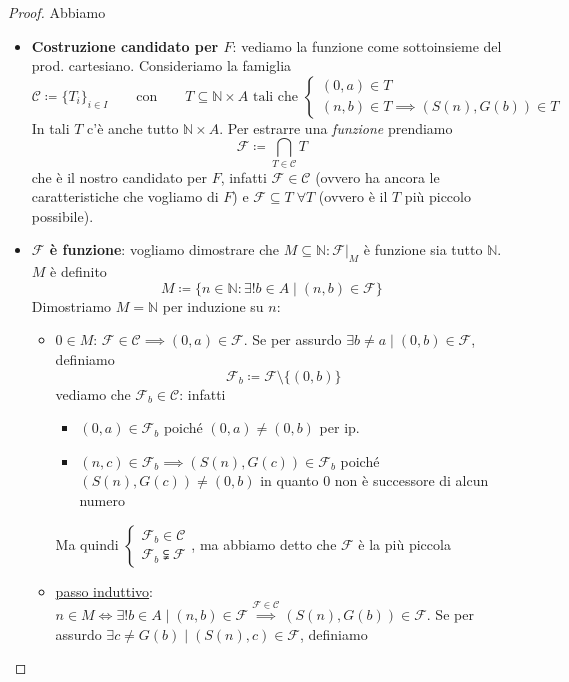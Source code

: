 \documentclass[a4paper,10pt]{article}
\theoremstyle{definition}
\theoremstyle{indentdefinition}
\theoremstyle{indentpostulate}
\theoremstyle{indenttheorem}
\theoremstyle{myremark}
\theoremstyle{indentgeneral}
\begin{document}
\begin{proof}
    Abbiamo
    \begin{itemize}
        \item \textbf{Costruzione candidato per $F$}: vediamo la funzione come sottoinsieme del prod. cartesiano. Consideriamo la famiglia
        $$\mathscr{C}\coloneqq \{T_i\}_{i\in I}\qquad \text{con} \qquad T\subseteq \mathbb{N}\times A \text{ tali che } \begin{cases}
            (0,a)\in T\\
            (n,b)\in T\implies (S(n), G(b))\in T
        \end{cases}$$
    In tali $T$ c'è anche tutto $\mathbb{N}\times A$. Per estrarre una \textit{funzione} prendiamo 
    $$\mathscr{F}\coloneqq\bigcap_{T\in \mathscr{C}}T$$
    che è il nostro candidato per $F$, infatti $\mathscr{F}\in\mathscr{C}$ (ovvero ha ancora le caratteristiche che vogliamo di $F$) e $\mathscr{F}\subseteq T\;\forall T$ (ovvero è il $T$ più piccolo possibile).
        \item \textbf{$\mathscr{F}$ è funzione}: vogliamo dimostrare che $M\subseteq \mathbb{N}: \mathscr{F}|_M$ è funzione sia tutto $\mathbb{N}$. $M$ è definito 
        $$M\coloneqq \{n\in \mathbb{N}: \exists !b\in A\mid (n,b)\in \mathscr{F}\}$$
        Dimostriamo $M=\mathbb{N}$ per induzione su $n$:
        \begin{itemize}
            \item \underline{$0\in M$}: $\mathscr{F}\in \mathscr{C}\implies (0,a)\in \mathscr{F}$. Se per assurdo $\exists b\ne a\mid (0,b)\in\mathscr{F}$, definiamo
            $$\mathscr{F}_b\coloneqq \mathscr{F}\setminus \{(0,b)\}$$
            vediamo che $\mathscr{F}_b\in \mathscr{C}$: infatti
            \begin{itemize}
                \item $(0,a)\in\mathscr{F}_b$ poiché $(0,a)\ne (0,b)$ per ip.
                \item $(n,c)\in\mathscr{F}_b\implies (S(n),G(c))\in \mathscr{F}_b$ poiché $(S(n),G(c))\ne (0,b)$ in quanto 0 non è successore di alcun numero
            \end{itemize}
            Ma quindi $\begin{cases}
                \mathscr{F}_b\in \mathscr{C} \\
                \mathscr{F}_b\subsetneqq \mathscr{F}
            \end{cases}$, ma abbiamo detto che $\mathscr{F}$ è la più piccola \lightning
            \item \underline{passo induttivo}:  $n\in M\iff \exists!b\in A\mid (n,b)\in \mathscr{F}\overset{\mathscr{F}\in\mathscr{C}}{\implies} (S(n),G(b))\in \mathscr{F}$. Se per assurdo $\exists c\ne G(b)\mid (S(n),c)\in\mathscr{F}$, definiamo

\end{itemize}
\end{itemize}
\end{proof}
\end{document}
